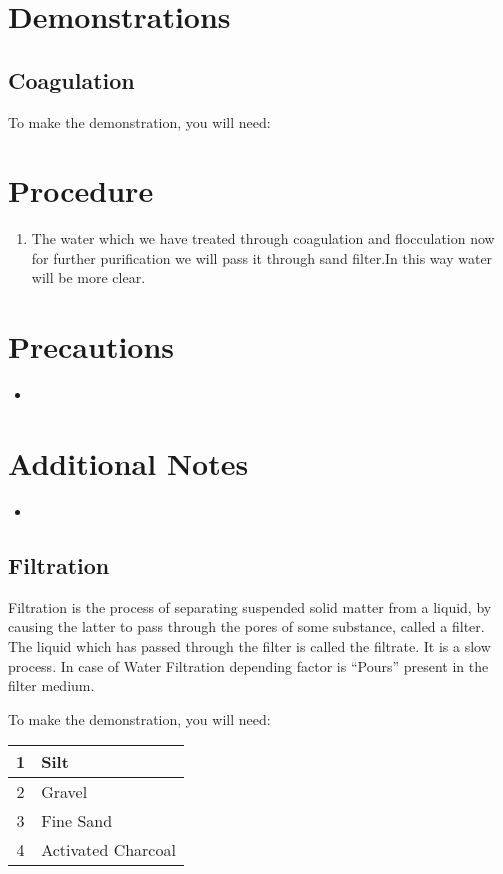 \section*{Demonstrations}

\subsection*{Coagulation}

To make the demonstration, you will need:

\section*{Procedure}
\begin{enumerate}
    \item The water which we have treated through coagulation and flocculation now for further purification we will pass it through sand filter.In this way water will be more clear.
\end{enumerate}

\section*{Precautions}
\begin{itemize}[leftmargin=*]
\item 
\end{itemize}

\section*{Additional Notes}
\begin{itemize}[leftmargin=*]
\item 
 \end{itemize}

\subsection*{Filtration}
Filtration is the process of separating suspended solid matter from a liquid, by causing the latter to pass through the pores of some substance, called a filter. The liquid which has passed through the filter is called the filtrate.
It is a slow process. In case of Water Filtration depending factor is “Pours” present in the filter medium.

To make the demonstration, you will need:

\begin{table}[H]
    \centering
    \begin{tabular}{|c|l|}\hline
    1	&   Silt \\\hline
    2   &	Gravel \\\hline
    3   &  Fine Sand \\\hline
    4   &   Activated Charcoal\\\hline
    \end{tabular}
\end{table}

